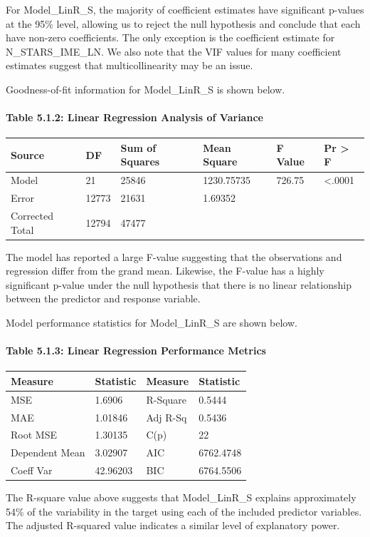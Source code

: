 \documentclass[]{article}
\let\oldparagraph\paragraph
\renewcommand{\paragraph}[1]{\oldparagraph{#1}\mbox{}}
\begin{document}
For Model\_LinR\_S, the majority of coefficient estimates have
significant p-values at the 95\% level, allowing us to reject the null
hypothesis and conclude that each have non-zero coefficients. The only
exception is the coefficient estimate for N\_STARS\_IME\_LN. We also
note that the VIF values for many coefficient estimates suggest that
multicollinearity may be an issue.

Goodness-of-fit information for Model\_LinR\_S is shown below.

\paragraph{Table 5.1.2: Linear Regression Analysis of
Variance}\label{table-5.1.2-linear-regression-analysis-of-variance}

\begin{longtable}[]{@{}llllll@{}}
\toprule
Source & DF & Sum of Squares & Mean Square & F Value & Pr \textgreater{}
F\tabularnewline
\midrule
\endhead
Model & 21 & 25846 & 1230.75735 & 726.75 &
\textless{}.0001\tabularnewline
Error & 12773 & 21631 & 1.69352 & &\tabularnewline
Corrected Total & 12794 & 47477 & & &\tabularnewline
\bottomrule
\end{longtable}

The model has reported a large F-value suggesting that the observations
and regression differ from the grand mean. Likewise, the F-value has a
highly significant p-value under the null hypothesis that there is no
linear relationship between the predictor and response variable.

Model performance statistics for Model\_LinR\_S are shown below.

\paragraph{Table 5.1.3: Linear Regression Performance
Metrics}\label{table-5.1.3-linear-regression-performance-metrics}

\begin{longtable}[]{@{}llll@{}}
\toprule
Measure & Statistic & Measure & Statistic\tabularnewline
\midrule
\endhead
MSE & 1.6906 & R-Square & 0.5444\tabularnewline
MAE & 1.01846 & Adj R-Sq & 0.5436\tabularnewline
Root MSE & 1.30135 & C(p) & 22\tabularnewline
Dependent Mean & 3.02907 & AIC & 6762.4748\tabularnewline
Coeff Var & 42.96203 & BIC & 6764.5506\tabularnewline
\bottomrule
\end{longtable}

The R-square value above suggests that Model\_LinR\_S explains
approximately 54\% of the variability in the target using each of the
included predictor variables. The adjusted R-squared value indicates a
similar level of explanatory power.
\end{document}
